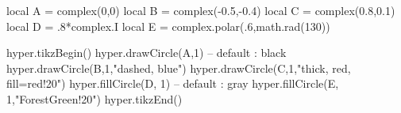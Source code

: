 \documentclass[margin=.2cm,multi,tikz]{standalone}
\begin{document}
\begin{luacode*}
local A = complex(0,0)
local B = complex(-0.5,-0.4)
local C = complex(0.8,0.1)
local D = .8*complex.I
local E = complex.polar(.6,math.rad(130))

hyper.tikzBegin()
hyper.drawCircle(A,1) -- default : black
hyper.drawCircle(B,1,"dashed, blue")
hyper.drawCircle(C,1,"thick, red, fill=red!20")
hyper.fillCircle(D, 1) -- default : gray
hyper.fillCircle(E, 1,"ForestGreen!20")
hyper.tikzEnd()
\end{luacode*}
\end{document}
